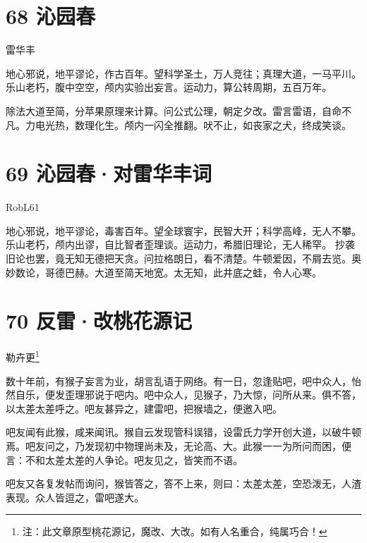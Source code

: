 \documentclass[UTF8,12pt,oneside]{ctexbook}
\begin{document}
        \section{68 沁园春}
        \begin{center}
            雷华丰
        \end{center}
        
        地心邪说，地平谬论，作古百年。望科学圣土，万人竞往；真理大道，一马平川。乐山老朽，腹中空空，颅内实验出妄言。运动力，算公转周期，五百万年。
        
        除法大道至简，分苹果原理来计算。问公式公理，朝定夕改。雷言雷语，自命不凡。力电光热，数理化生。颅内一闪全推翻。吠不止，如丧家之犬，终成笑谈。
        
        \newpage
        
        \section{69 沁园春·对雷华丰词}
        \begin{center}
            RobL61
        \end{center}
        
        地心邪说，地平谬论，毒害百年。望全球寰宇，民智大开；科学高峰，无人不攀。乐山老朽，颅内出谬，自比智者歪理谈。运动力，希腊旧理论，无人稀罕。
        抄袭旧论也罢，竟无知无德把天贪。问拉格朗日，看不清楚。牛顿爱因，不屑去览。奥妙数论，哥德巴赫。大道至简天地宽。太无知，此井底之蛙，令人心寒。
        
        \section{70 反雷·改桃花源记}
        \begin{center}
            勒卉更\footnote{注：此文章原型桃花源记，魔改、大改。如有人名重合，纯属巧合！}
        \end{center}
        
        数十年前，有猴子妄言为业，胡言乱语于网络。有一日，忽逢贴吧，吧中众人，怡然自乐，便发歪理邪说于吧内。吧中众人，见猴子，乃大惊，问所从来。俱不答，以太差太差呼之。吧友甚异之，建雷吧，把猴墙之，便邀入吧。
        
        吧友闻有此猴，咸来闻讯。猴自云发现管科误错，设雷氏力学开创大道，以破牛顿焉。吧友问之，乃发现初中物理尚未及，无论高、大。此猴一一为所问而困，便言：不和太差太差的人争论。吧友见之，皆笑而不语。
        
        吧友又各复发帖而询问，猴皆答之，答不上来，则曰：太差太差，空恐泼无，人渣表现。众人皆逗之，雷吧遂大。
        
\end{document}
